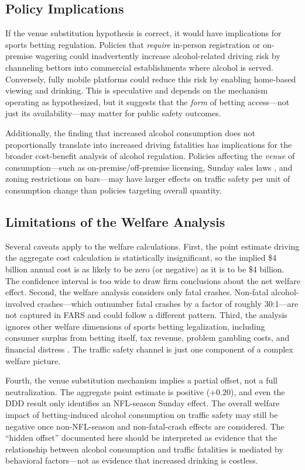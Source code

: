 \documentclass[12pt]{article}
\begin{document}
\subsection{Policy Implications}

If the venue substitution hypothesis is correct, it would have implications for sports betting regulation. Policies that \emph{require} in-person registration or on-premise wagering could inadvertently increase alcohol-related driving risk by channeling bettors into commercial establishments where alcohol is served. Conversely, fully mobile platforms could reduce this risk by enabling home-based viewing and drinking. This is speculative and depends on the mechanism operating as hypothesized, but it suggests that the \emph{form} of betting access---not just its availability---may matter for public safety outcomes.

Additionally, the finding that increased alcohol consumption does not proportionally translate into increased driving fatalities has implications for the broader cost-benefit analysis of alcohol regulation. Policies affecting the \emph{venue} of consumption---such as on-premise/off-premise licensing, Sunday sales laws \citep{heaton2012sunday}, and zoning restrictions on bars---may have larger effects on traffic safety per unit of consumption change than policies targeting overall quantity.

\subsection{Limitations of the Welfare Analysis}

Several caveats apply to the welfare calculations. First, the point estimate driving the aggregate cost calculation is statistically insignificant, so the implied \$4 billion annual cost is as likely to be zero (or negative) as it is to be \$4 billion. The confidence interval is too wide to draw firm conclusions about the net welfare effect. Second, the welfare analysis considers only fatal crashes. Non-fatal alcohol-involved crashes---which outnumber fatal crashes by a factor of roughly 30:1---are not captured in FARS and could follow a different pattern. Third, the analysis ignores other welfare dimensions of sports betting legalization, including consumer surplus from betting itself, tax revenue, problem gambling costs, and financial distress \citep{hollenbeck2025financial}. The traffic safety channel is just one component of a complex welfare picture.

Fourth, the venue substitution mechanism implies a partial offset, not a full neutralization. The aggregate point estimate is positive ($+0.20$), and even the DDD result only identifies an NFL-season Sunday effect. The overall welfare impact of betting-induced alcohol consumption on traffic safety may still be negative once non-NFL-season and non-fatal-crash effects are considered. The ``hidden offset'' documented here should be interpreted as evidence that the relationship between alcohol consumption and traffic fatalities is mediated by behavioral factors---not as evidence that increased drinking is costless.
\end{document}
